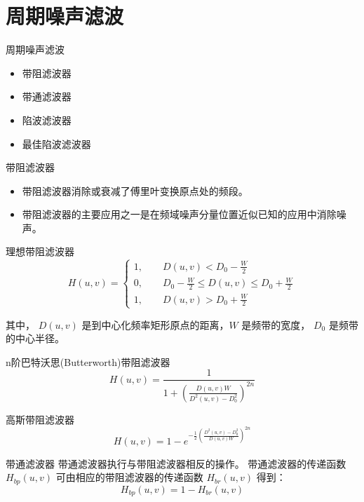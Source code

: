 \documentclass[presentation]{beamer}
\begin{document}
\section{周期噪声滤波}
\label{sec:org8286c41}
\begin{frame}[label={sec:org4802d73}]{周期噪声滤波}
\begin{itemize}
\item 带阻滤波器
\item 带通滤波器
\item 陷波滤波器
\item 最佳陷波滤波器
\end{itemize}
\end{frame}

\begin{frame}[label={sec:org4cb8198}]{带阻滤波器}
\begin{itemize}
\item 带阻滤波器消除或衰减了傅里叶变换原点处的频段。
\item 带阻滤波器的主要应用之一是在频域噪声分量位置近似已知的应用中消除噪声。
\end{itemize}
\end{frame}
\begin{frame}[label={sec:org7ec4eb3}]{理想带阻滤波器}
\[ H(u,v)=
\begin{cases}
1, \qquad D(u,v)<D_0-\frac{W}{2} \\
0, \qquad D_0-\frac{W}{2} \leq D(u,v) \leq D_0+\frac{W}{2}\\
1, \qquad D(u,v)>D_0+\frac{W}{2}
\end{cases} \]

其中， \(D(u,v)\) 是到中心化频率矩形原点的距离，\(W\) 是频带的宽度， \(D_0\) 是频带的中心半径。
\end{frame}

\begin{frame}[label={sec:org90a9a7f}]{n阶巴特沃思(Butterworth)带阻滤波器}
\[ H(u,v) = \frac{1}{1+\left(\frac{D(u,v)W}{D^2(u,v)-D_0^2}\right)^{2n}} \]
\end{frame}

\begin{frame}[label={sec:orgedf1c30}]{高斯带阻滤波器}
\[ H(u,v)=1-e^{-\frac{1}{2}\left(\frac{D^2(u,v)-D_0^2}{D(u,v)W}\right)^{2n}} \]
\end{frame}

\begin{frame}[label={sec:org3b7aad5}]{带通滤波器}
带通滤波器执行与带阻滤波器相反的操作。
带通滤波器的传递函数 \(H_{bp}(u,v)\) 可由相应的带阻滤波器的传递函数 \(H_{br}(u,v)\) 得到：
\[ H_{bp}(u,v)=1-H_{br}(u,v) \]
\end{frame}
\end{document}
